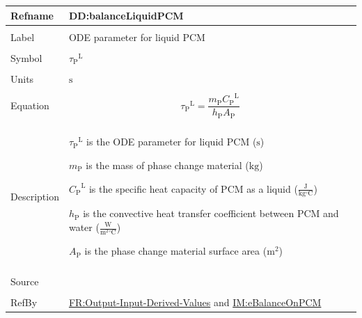\documentclass[12pt]{article}
\begin{document}
\vspace{\baselineskip}
\noindent
\begin{minipage}{\textwidth}
\begin{tabular}{>{\raggedright}p{}>{\raggedright\arraybackslash}p{}}
\toprule \textbf{Refname} & \textbf{DD:balanceLiquidPCM}
\label{DD:balanceLiquidPCM}
\\ \midrule \\
Label & ODE parameter for liquid PCM
        
\\ \midrule \\
Symbol & ${{τ_{\text{P}}}^{\text{L}}}$
         
\\ \midrule \\
Units & ${\text{s}}$
        
\\ \midrule \\
Equation & \begin{displaymath}
           {{τ_{\text{P}}}^{\text{L}}}=\frac{{m_{\text{P}}} {{C_{\text{P}}}^{\text{L}}}}{{h_{\text{P}}} {A_{\text{P}}}}
           \end{displaymath}
\\ \midrule \\
Description & \begin{symbDescription}
              \item{${{τ_{\text{P}}}^{\text{L}}}$ is the ODE parameter for liquid PCM (${\text{s}}$)}
              \item{${m_{\text{P}}}$ is the mass of phase change material (${\text{kg}}$)}
              \item{${{C_{\text{P}}}^{\text{L}}}$ is the specific heat capacity of PCM as a liquid ($\frac{\text{J}}{\text{kg}{}^{\circ}\text{C}}$)}
              \item{${h_{\text{P}}}$ is the convective heat transfer coefficient between PCM and water ($\frac{\text{W}}{\text{m}^{2}{}^{\circ}\text{C}}$)}
              \item{${A_{\text{P}}}$ is the phase change material surface area (${\text{m}^{2}}$)}
              \end{symbDescription}
\\ \midrule \\
Source & \cite{lightstone2012}
         
\\ \midrule \\
RefBy & \hyperref[outputInputDerivVals]{FR:Output-Input-Derived-Values} and \hyperref[IM:eBalanceOnPCM]{IM:eBalanceOnPCM}
        
\\ \bottomrule
\end{tabular}
\end{minipage}
\end{document}
